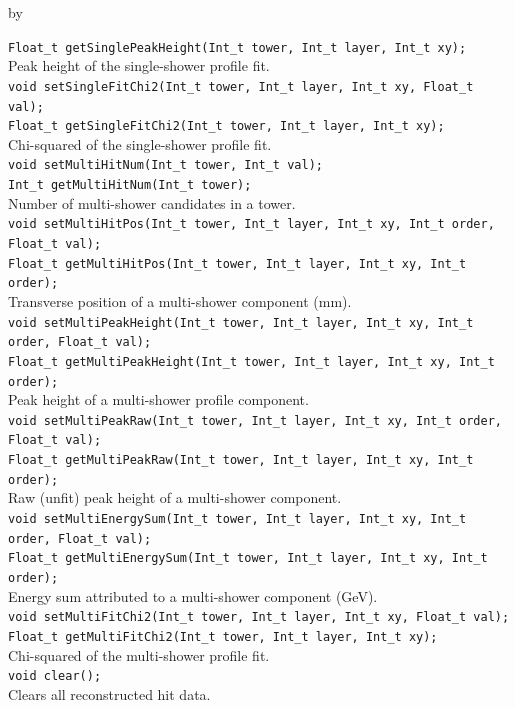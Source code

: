 \documentclass[twoside]{article}
\newcommand{\entrylabel}[1]{\mbox{\textbf{{#1}}}\hfil}%
\newenvironment{entry}
{\begin{list}{}%
    {\renewcommand{\makelabel}{\entrylabel}%
     \setlength{\labelwidth}{90pt}%
     \setlength{\leftmargin}{\labelwidth}
     \advance\leftmargin by \labelsep%
      }%
    }%
  {\end{list}}
\newcommand{\Entrylabel}[1]%
{\raisebox{0pt}[1ex][0pt]{\makebox[\labelwidth][l]%
    {\parbox[t]{\labelwidth}{\hspace{0pt}\textbf{{#1}}}}}}
\newenvironment{Entry}%
{\renewcommand{\entrylabel}{\Entrylabel}\begin{entry}}%
  {\end{entry}}
\begin{document}
\begin{Entry}
    \verb+Float_t getSinglePeakHeight(Int_t tower, Int_t layer, Int_t xy);+\\
    Peak height of the single-shower profile fit.\\
    \verb+void setSingleFitChi2(Int_t tower, Int_t layer, Int_t xy, Float_t val);+\\
    \verb+Float_t getSingleFitChi2(Int_t tower, Int_t layer, Int_t xy);+\\
    Chi-squared of the single-shower profile fit.\\
    \verb+void setMultiHitNum(Int_t tower, Int_t val);+\\
    \verb+Int_t getMultiHitNum(Int_t tower);+\\
    Number of multi-shower candidates in a tower.\\
    \verb+void setMultiHitPos(Int_t tower, Int_t layer, Int_t xy, Int_t order, Float_t val);+\\
    \verb+Float_t getMultiHitPos(Int_t tower, Int_t layer, Int_t xy, Int_t order);+\\
    Transverse position of a multi-shower component (mm).\\
    \verb+void setMultiPeakHeight(Int_t tower, Int_t layer, Int_t xy, Int_t order, Float_t val);+\\
    \verb+Float_t getMultiPeakHeight(Int_t tower, Int_t layer, Int_t xy, Int_t order);+\\
    Peak height of a multi-shower profile component.\\
    \verb+void setMultiPeakRaw(Int_t tower, Int_t layer, Int_t xy, Int_t order, Float_t val);+\\
    \verb+Float_t getMultiPeakRaw(Int_t tower, Int_t layer, Int_t xy, Int_t order);+\\
    Raw (unfit) peak height of a multi-shower component.\\
    \verb+void setMultiEnergySum(Int_t tower, Int_t layer, Int_t xy, Int_t order, Float_t val);+\\
    \verb+Float_t getMultiEnergySum(Int_t tower, Int_t layer, Int_t xy, Int_t order);+\\
    Energy sum attributed to a multi-shower component (GeV).\\
    \verb+void setMultiFitChi2(Int_t tower, Int_t layer, Int_t xy, Float_t val);+\\
    \verb+Float_t getMultiFitChi2(Int_t tower, Int_t layer, Int_t xy);+\\
    Chi-squared of the multi-shower profile fit.\\
    \verb+void clear();+\\
    Clears all reconstructed hit data.\\
\end{Entry}
\clearpage
\end{document}
